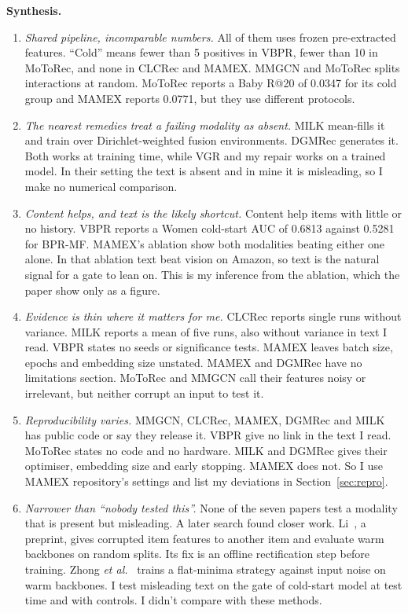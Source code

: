 \documentclass[conference]{IEEEtran}
\begin{document}
\textbf{Synthesis.}
\begin{enumerate}
\item \emph{Shared pipeline, incomparable numbers.} All of them uses frozen pre-extracted features. ``Cold'' means fewer than 5 positives in VBPR, fewer than 10 in MoToRec, and none in CLCRec and MAMEX. MMGCN and MoToRec splits interactions at random. MoToRec reports a Baby R@20 of 0.0347 for its cold group and MAMEX reports 0.0771, but they use different protocols.
\item \emph{The nearest remedies treat a failing modality as absent.} MILK mean-fills it and train over Dirichlet-weighted fusion environments. DGMRec generates it. Both works at training time, while VGR and my repair works on a trained model. In their setting the text is absent and in mine it is misleading, so I make no numerical comparison.
\item \emph{Content helps, and text is the likely shortcut.} Content help items with little or no history. VBPR reports a Women cold-start AUC of 0.6813 against 0.5281 for BPR-MF. MAMEX's ablation show both modalities beating either one alone. In that ablation text beat vision on Amazon, so text is the natural signal for a gate to lean on. This is my inference from the ablation, which the paper show only as a figure.
\item \emph{Evidence is thin where it matters for me.} CLCRec reports single runs without variance. MILK reports a mean of five runs, also without variance in text I read. VBPR states no seeds or significance tests. MAMEX leaves batch size, epochs and embedding size unstated. MAMEX and DGMRec have no limitations section. MoToRec and MMGCN call their features noisy or irrelevant, but neither corrupt an input to test it.
\item \emph{Reproducibility varies.} MMGCN, CLCRec, MAMEX, DGMRec and MILK has public code or say they release it. VBPR give no link in the text I read. MoToRec states no code and no hardware. MILK and DGMRec gives their optimiser, embedding size and early stopping. MAMEX does not. So I use MAMEX repository's settings and list my deviations in Section~\ref{sec:repro}.
\item \emph{Narrower than ``nobody tested this''.} None of the seven papers test a modality that is present but misleading. A later search found closer work. Li~\cite{li2026trustworthy}, a preprint, gives corrupted item features to another item and evaluate warm backbones on random splits. Its fix is an offline rectification step before training. Zhong \emph{et al.}~\cite{zhong2024mirror} trains a flat-minima strategy against input noise on warm backbones. I test misleading text on the gate of cold-start model at test time and with controls. I didn't compare with these methods.
\end{enumerate}
\end{document}
